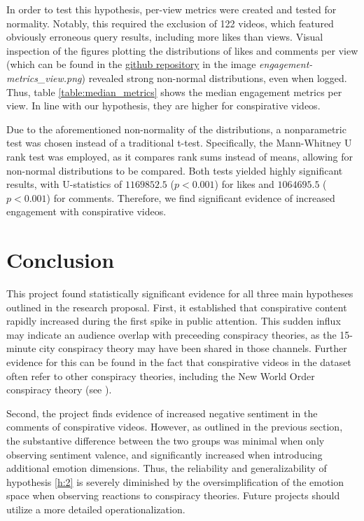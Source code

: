 \documentclass[fontsize=11pt, parskip=half]{scrartcl}
\begin{document}
    In order to test this hypothesis, per-view metrics were created and tested for normality. Notably, this required the exclusion of 122 videos, which featured obviously erroneous query results, including more likes than views. Visual inspection of the figures plotting the distributions of likes and comments per view (which can be found in the \href{https://github.com/julia-king-edu/so-24_smda_project}{github repository} in the image \textit{engagement-metrics\_view.png}) revealed strong non-normal distributions, even when logged. Thus, table \ref{table:median_metrics} shows the median engagement metrics per view. In line with our hypothesis, they are higher for conspirative videos.
    
    Due to the aforementioned non-normality of the distributions, a nonparametric test was chosen instead of a traditional t-test. Specifically, the Mann-Whitney U rank test was employed, as it compares rank sums instead of means, allowing for non-normal distributions to be compared. Both tests yielded highly significant results, with U-statistics of $1169852.5$ ($p < 0.001$) for likes and $1064695.5$ ($p < 0.001$) for comments. Therefore, we find significant evidence of increased engagement with conspirative videos.    

\section{Conclusion}
\label{section:conclusion}

    This project found statistically significant evidence for all three main hypotheses outlined in the research proposal. First, it established that conspirative content rapidly increased during the first spike in public attention. This sudden influx may indicate an audience overlap with preceeding conspiracy theories, as the 15-minute city conspiracy theory may have been shared in those channels. Further evidence for this can be found in the fact that conspirative videos in the dataset often refer to other conspiracy theories, including the New World Order conspiracy theory (see \cite{sparkConjuringOrderNew2000}). 

    Second, the project finds evidence of increased negative sentiment in the comments of conspirative videos. However, as outlined in the previous section, the substantive difference between the two groups was minimal when only observing sentiment valence, and significantly increased when introducing additional emotion dimensions. Thus, the reliability and generalizability of hypothesis \ref{h:2} is severely diminished by the oversimplification of the emotion space when observing reactions to conspiracy theories. Future projects should utilize a more detailed operationalization.
\end{document}
